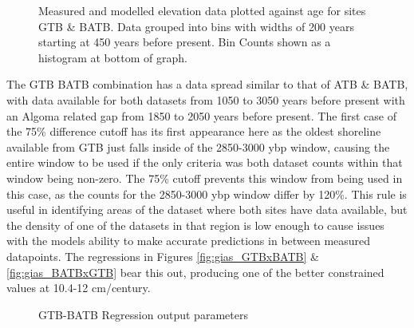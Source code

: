 \begin{figure}[H]
	\caption{Measured and modelled elevation data plotted against age for sites GTB \& BATB. Data grouped into bins with widths of 200 years starting at 450 years before present. Bin Counts shown as a histogram at bottom of graph.}	
	\label{fig:data_GTBxBATB}
\end{figure}
The GTB BATB combination has a data spread similar to that of ATB \& BATB, with
data available for both datasets from 1050 to 3050 years before present with an
Algoma related gap from 1850 to 2050 years before present. The first case of the
75\% difference cutoff has its first appearance here as the oldest shoreline available from GTB
just falls inside of the 2850-3000 ybp window, causing the entire window to be
used if the only criteria was both dataset counts within that window being non-zero.
The 75\% cutoff prevents this window from being used in this case, as the counts
for the 2850-3000 ybp window differ by 120\%. This rule is useful in identifying
areas of the dataset where both sites have data available, but the density of
one of the datasets in that region is low enough to cause issues with the models
ability to make accurate predictions in between measured datapoints.
The regressions in
Figures \ref{fig:gias_GTBxBATB} \& \ref{fig:gias_BATBxGTB} bear this out,
producing one of the better constrained values at 10.4-12 cm/century. \\


\begin{figure}[H]
	\begin{flushleft}
	\end{flushleft}
	\caption{GTB-BATB Regression output parameters}
	\label{fig:GTBxBATB_regression}
\end{figure}

